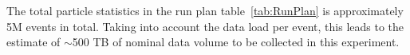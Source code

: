 %
%
%
%
%



The total particle statistics in the run plan table~\ref{tab:RunPlan} is approximately 5M events in total.  Taking into account the data load per event, this leads to the estimate of $\sim$500 TB of nominal data volume to be collected in this experiment. 

